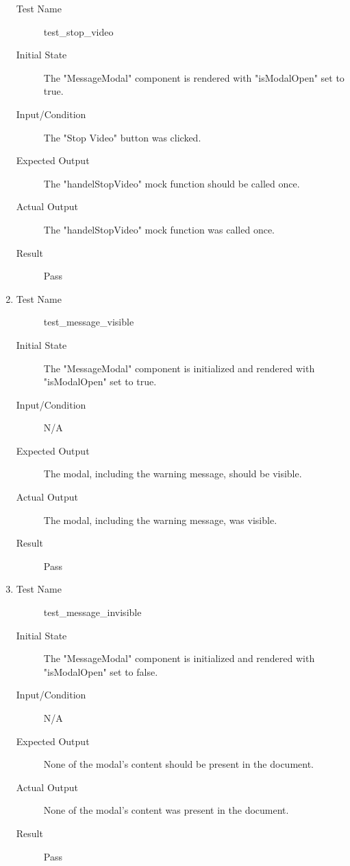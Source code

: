 \documentclass[12pt, titlepage]{article}
\begin{document}
\begin{enumerate}[UT-OT1]
  \begin{description}
  \item[Test Name] test\_stop\_video
  \item[Initial State] The "MessageModal" component is rendered with
    "isModalOpen" set to true.
  \item[Input/Condition] The "Stop Video" button was clicked.
  \item[Expected Output] The "handelStopVideo" mock function should be called
    once.
  \item[Actual Output] The "handelStopVideo" mock function was called once.
  \item[Result] Pass
  \end{description}
\item \label{UT-OT5}
  \begin{description}
  \item[Test Name] test\_message\_visible
  \item[Initial State] The "MessageModal" component is initialized and rendered
    with "isModalOpen" set to true.
  \item[Input/Condition] N/A
  \item[Expected Output] The modal, including the warning message, should be
    visible.
  \item[Actual Output] The modal, including the warning message, was visible.
  \item[Result] Pass
  \end{description}
\item \label{UT-OT6}
  \begin{description}
  \item[Test Name] test\_message\_invisible
  \item[Initial State] The "MessageModal" component is initialized and rendered
    with "isModalOpen" set to false.
  \item[Input/Condition] N/A
  \item[Expected Output] None of the modal's content should be present in the
    document.
  \item[Actual Output] None of the modal's content was present in the document.
  \item[Result] Pass
  \end{description}
\end{enumerate}
\end{document}
